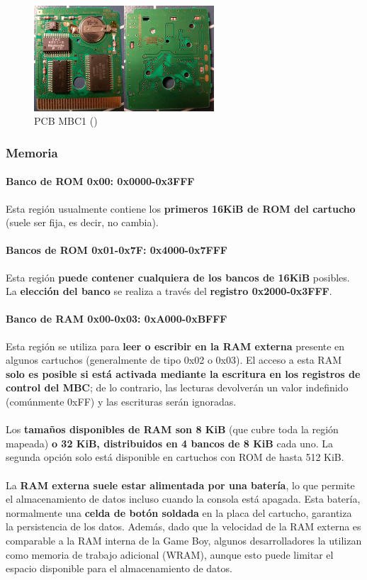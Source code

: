 \begin{figure}[H]
    \centering
    \includegraphics[width=0.6\textwidth]{include/images/mbc1.jpg}
    \caption{PCB MBC1 (\cite{hardwaredatabase})}
    \label{figure:cart_mbc1}
\end{figure}

\subsubsection{Memoria}

\paragraph{Banco de ROM 0x00: 0x0000-0x3FFF}
\label{par:rom0bank}
Esta región usualmente contiene los \textbf{primeros 16KiB de ROM del cartucho} (suele ser fija, es decir, no cambia).

\paragraph{Bancos de ROM 0x01-0x7F: 0x4000-0x7FFF}
Esta región \textbf{puede contener cualquiera de los bancos de 16KiB} posibles. La \textbf{elección del banco} se realiza a través del \textbf{registro 0x2000-0x3FFF}.

\paragraph{Banco de RAM 0x00-0x03: 0xA000-0xBFFF}
Esta región se utiliza para \textbf{leer o escribir en la RAM externa} presente en algunos cartuchos (generalmente de tipo 0x02 o 0x03). El acceso a esta RAM \textbf{solo es posible si está activada mediante la escritura en los registros de control del MBC}; de lo contrario, las lecturas devolverán un valor indefinido (comúnmente 0xFF) y las escrituras serán ignoradas.
\\\\
Los \textbf{tamaños disponibles de RAM son 8 KiB} (que cubre toda la región mapeada) \textbf{o 32 KiB, distribuidos en 4 bancos de 8 KiB} cada uno. La segunda opción solo está disponible en cartuchos con ROM de hasta 512 KiB.
\\\\
La \textbf{RAM externa suele estar alimentada por una batería}, lo que permite el almacenamiento de datos incluso cuando la consola está apagada. Esta batería, normalmente una \textbf{celda de botón soldada} en la placa del cartucho, garantiza la persistencia de los datos. Además, dado que la velocidad de la RAM externa es comparable a la RAM interna de la Game Boy, algunos desarrolladores la utilizan como memoria de trabajo adicional (WRAM), aunque esto puede limitar el espacio disponible para el almacenamiento de datos.

